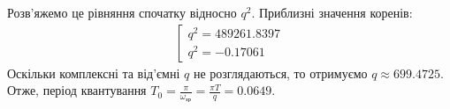 Розв'яжемо це рівняння спочатку відносно $q^2$. Приблизні значення коренів: 
\begin{gather*}
    \left[
        \begin{array}{ll}
            q^2 = 489261.8397 \\
            q^2 = -0.17061
        \end{array}
    \right.
\end{gather*}
Оскільки комплексні та від'ємні $q$ не розглядаються, то отримуємо $q \approx 699.4725$.
Отже, період квантування $T_0 = \frac{\pi}{\omega_{\text{зр}}} = 
\frac{\pi T}{q} = 0.0649$.